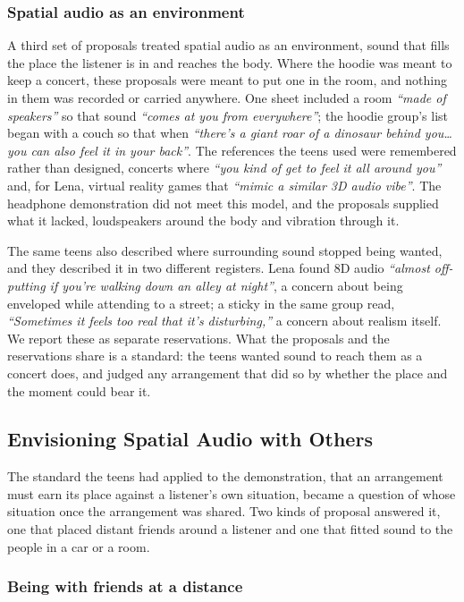 \subsubsection{Spatial audio as an environment}

A third set of proposals treated spatial audio as an environment, sound that fills the place the listener is in and reaches the body. Where the hoodie was meant to keep a concert, these proposals were meant to put one in the room, and nothing in them was recorded or carried anywhere. One sheet included a room \textit{``made of speakers''} so that sound \textit{``comes at you from everywhere''}; the hoodie group's list began with a couch so that when \textit{``there's a giant roar of a dinosaur behind you\ldots{} you can also feel it in your back''}. The references the teens used were remembered rather than designed, concerts where \textit{``you kind of get to feel it all around you''} and, for Lena, virtual reality games that \textit{``mimic a similar 3D audio vibe''}. The headphone demonstration did not meet this model, and the proposals supplied what it lacked, loudspeakers around the body and vibration through it.

The same teens also described where surrounding sound stopped being wanted, and they described it in two different registers. Lena found 8D audio \textit{``almost off-putting if you're walking down an alley at night''}, a concern about being enveloped while attending to a street; a sticky in the same group read, \textit{``Sometimes it feels too real that it's disturbing,''} a concern about realism itself. We report these as separate reservations. What the proposals and the reservations share is a standard: the teens wanted sound to reach them as a concert does, and judged any arrangement that did so by whether the place and the moment could bear it.

\subsection{Envisioning Spatial Audio with Others}
\label{sec:4.3}

The standard the teens had applied to the demonstration, that an arrangement must earn its place against a listener's own situation, became a question of whose situation once the arrangement was shared. Two kinds of proposal answered it, one that placed distant friends around a listener and one that fitted sound to the people in a car or a room.

\subsubsection{Being with friends at a distance}

